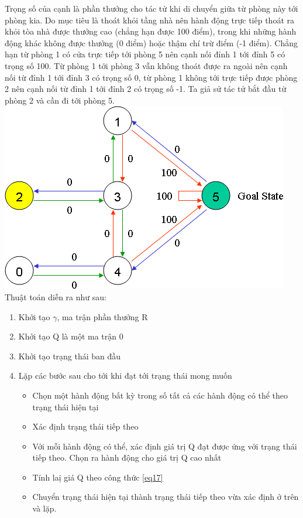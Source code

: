 \documentclass[14pt,a4paper,oneside]{report}		%
\begin{document}
Trọng số của cạnh là phần thưởng cho tác tử khi di chuyển giữa từ phòng này tới phòng kia. Do mục tiêu là thoát khỏi tầng nhà nên hành động trực tiếp thoát ra khỏi tòa nhà được thưởng cao (chẳng hạn được 100 điểm), trong khi những hành động khác không được thưởng (0 điểm) hoặc thậm chí trừ điểm (-1 điểm). Chẳng hạn từ phòng 1 có cửa trực tiếp tới phòng 5 nên cạnh nối đỉnh 1 tới đỉnh 5 có trọng số 100. Từ phòng 1 tới phòng 3 vẫn không thoát được ra ngoài nên cạnh nối từ đỉnh 1 tới đỉnh 3 có trọng số 0, từ phòng 1 không tới trực tiếp được phòng 2 nên cạnh nối từ đỉnh 1 tới đỉnh 2 có trọng số -1. Ta giả sử tác tử bắt đầu từ phòng 2 và cần đi tới phòng 5.\\
\includegraphics[width=\textwidth,height=\textheight,keepaspectratio]{3.png}
\\
	Thuật toán diễn ra như sau:
\begin{enumerate}
\item Khởi tạo $\gamma$, ma trận phần thưởng R
\item Khởi tạo Q là một ma trận 0
\item Khởi tạo trạng thái ban đầu
\item Lặp các bước sau cho tới khi đạt tới trạng thái mong muốn
\begin{itemize}
\item Chọn một hành động bất kỳ trong số tất cả các hành động có thể theo trạng thái hiện tại
\item Xác định trạng thái tiếp theo
\item Với mỗi hành động có thể, xác định giá trị Q đạt được ứng với trạng thái tiếp theo. Chọn ra hành động cho giá trị Q cao nhất
\item Tính laị giá Q theo công thức \ref{eq17}
\item Chuyển trạng thái hiện tại thành trạng thái tiếp theo vừa xác định ở trên và lặp.
\end{itemize}
\end{enumerate}
\end{document}
